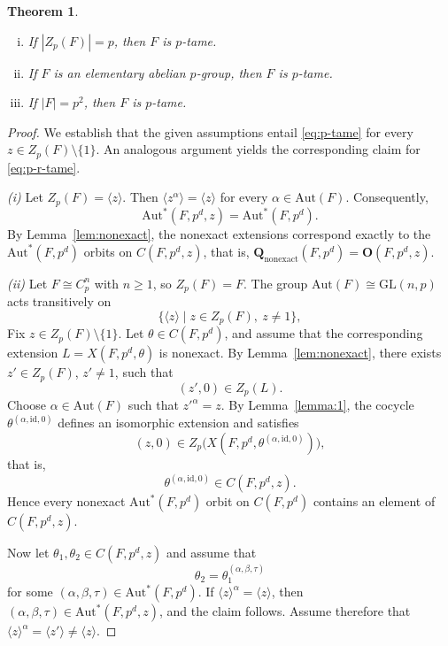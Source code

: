 \documentclass[12pt,a4paper]{amsart}
\newtheorem{theorem}{Theorem}[section]
\theoremstyle{definition}
\newcommand{\boldO}{\mathbf{O}}
\newcommand{\boldQnonexact}{\mathbf{Q}_{\mathrm{nonexact}}}
\begin{document}
\begin{theorem} \label{thm:p-tame-conditions}
\begin{enumerate}[(i)]
    \item If $|Z_{p}(F)|=p$, then $F$ is $p$-tame.
    \item If $F$ is an elementary abelian $p$-group, then $F$ is $p$-tame.
    \item If $|F|=p^2$, then $F$ is $p$-tame.
\end{enumerate}
\end{theorem}
\begin{proof}
We establish that the given assumptions entail \eqref{eq:p-tame} for every $z \in Z_p(F)\setminus \{1\}$. An analogous argument yields the corresponding claim for \eqref{eq:p-r-tame}.

\noindent\textit{(i)}
Let $Z_{p}(F)=\langle z\rangle$. Then $\langle z^{\alpha} \rangle = \langle z\rangle$ for every $\alpha\in\mathrm{Aut}(F)$. Consequently,
\[
\mathrm{Aut}^{\!*}(F,p^{d},z)=\mathrm{Aut}^{\!*}(F,p^{d}).
\]
By Lemma~\ref{lem:nonexact}, the nonexact extensions correspond exactly to the $\mathrm{Aut}^{\!*}(F,p^{d})$ orbits on $C(F,p^{d},z)$, that is, $\boldQnonexact(F,p^d) = \boldO(F,p^{d},z)$. 

\noindent\textit{(ii)} Let $F\cong C_{p}^{n}$ with $n\ge 1$, so $Z_{p}(F)=F$.
The group $\mathrm{Aut}(F)\cong \mathrm{GL}(n,p)$ acts transitively on
\[
\bigl\{\langle z\rangle \mid z\in Z_{p}(F),\ z\neq 1\bigr\},
\]
Fix $z \in Z_p(F) \setminus \{1\}$. Let $\theta\in C(F,p^{d})$, and assume that the corresponding extension $L=X(F,p^{d},\theta)$ is nonexact.
By Lemma~\ref{lem:nonexact}, there exists $z'\in Z_{p}(F)$, $z'\neq 1$, such that
\[
(z',0)\in Z_{p}(L).
\]
Choose $\alpha\in\mathrm{Aut}(F)$ such that $z'^{\alpha}=z$.
By Lemma~\ref{lemma:1}, the cocycle $\theta^{(\alpha,\mathrm{id},0)}$
defines an isomorphic extension and satisfies
\[
(z,0)\in Z_{p}\bigl(X(F,p^{d},\theta^{(\alpha,\mathrm{id},0)})\bigr),
\]
that is,
\[
\theta^{(\alpha,\mathrm{id},0)}\in C(F,p^{d},z).
\]
Hence every nonexact $\mathrm{Aut}^{\!*}(F,p^{d})$ orbit on $C(F,p^{d})$
contains an element of $C(F,p^{d},z)$.

Now let $\theta_{1},\theta_{2}\in C(F,p^{d},z)$ and assume that
\[
\theta_{2}=\theta_{1}^{(\alpha,\beta,\tau)}
\]
for some $(\alpha,\beta,\tau)\in\mathrm{Aut}^{\!*}(F,p^{d})$.
If $\langle z\rangle^{\alpha}=\langle z \rangle$, then $(\alpha,\beta,\tau)\in\mathrm{Aut}^{\!*}(F,p^{d},z)$, 
and the claim follows.
Assume therefore that $\langle z\rangle^{\alpha}=\langle z' \rangle \neq \langle z \rangle$.


\end{proof}
\end{document}
